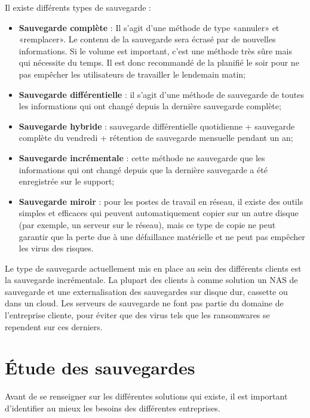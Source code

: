 \documentclass[pfe]{tnreport} %
\begin{document}
Il existe différents types de sauvegarde : \newline
\begin{itemize}
 \item \textbf{Sauvegarde complète} : Il s'agit d'une méthode de type «annuler» et «remplacer». Le contenu de la sauvegarde sera écrasé par de nouvelles informations. Si le volume est important, c'est une méthode très sûre mais qui nécessite du temps. Il est donc recommandé de la planifié le soir pour ne pas empêcher les utilisateurs de travailler le lendemain matin;
 \item \textbf{Sauvegarde différentielle} : il s'agit d'une méthode de sauvegarde de toutes les informations qui ont changé depuis la dernière sauvegarde complète;
 \item \textbf{Sauvegarde hybride} : sauvegarde différentielle quotidienne + sauvegarde complète du vendredi + rétention de sauvegarde mensuelle pendant un an;
 \item \textbf{Sauvegarde incrémentale} : cette méthode ne sauvegarde que les informations qui ont changé depuis que la dernière sauvegarde a été enregistrée sur le support;
 \item \textbf{Sauvegarde miroir} : pour les postes de travail en réseau, il existe des outils simples et efficaces qui peuvent automatiquement copier sur un autre disque (par exemple, un serveur sur le réseau), mais ce type de copie ne peut garantir que la perte due à une défaillance matérielle et ne peut pas empêcher les virus des risques. \newline
 \end{itemize}

Le type de sauvegarde actuellement mis en place au sein des différents clients est la sauvegarde incrémentale. 
La plupart des clients à comme solution un NAS de sauvegarde et une externalisation des sauvegardes sur disque dur, cassette ou dans un cloud.
Les serveurs de sauvegarde ne font pas partie du domaine de l'entreprise cliente, pour éviter que des virus tels que les ransomwares se rependent sur ces derniers.
\clearpage




\chapter{Étude des sauvegardes}

Avant de se renseigner sur les différentes solutions qui existe, il est important d'identifier au mieux les besoins des différentes entreprises.
\end{document}
